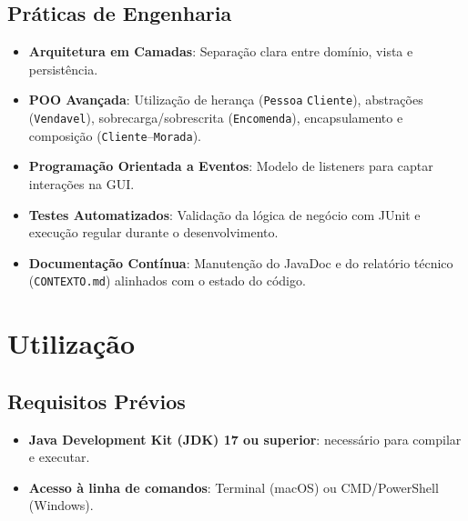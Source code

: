 \documentclass[a4paper,12pt]{article}
\begin{document}
\subsection{Práticas de Engenharia}
\begin{itemize}
    \item \textbf{Arquitetura em Camadas}: Separação clara entre domínio, vista e persistência.
    \item \textbf{POO Avançada}: Utilização de herança (\texttt{Pessoa} \textrightarrow \texttt{Cliente}), abstrações (\texttt{Vendavel}), sobrecarga/sobrescrita (\texttt{Encomenda}), encapsulamento e composição (\texttt{Cliente}--\texttt{Morada}).
    \item \textbf{Programação Orientada a Eventos}: Modelo de listeners para captar interações na GUI.
    \item \textbf{Testes Automatizados}: Validação da lógica de negócio com JUnit e execução regular durante o desenvolvimento.
    \item \textbf{Documentação Contínua}: Manutenção do JavaDoc e do relatório técnico (\texttt{CONTEXTO.md}) alinhados com o estado do código.
\end{itemize}

\section{Utilização}

\subsection{Requisitos Prévios}
\begin{itemize}
    \item \textbf{Java Development Kit (JDK) 17 ou superior}: necessário para compilar e executar.
    \item \textbf{Acesso à linha de comandos}: Terminal (macOS) ou CMD/PowerShell (Windows).
\end{itemize}
\end{document}
